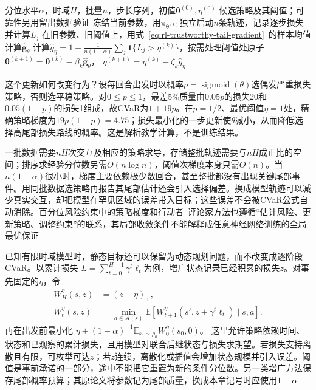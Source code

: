 \begin{algorithm}[累计CVaR的轨迹更新]
  \label{alg:rl-trustworthy-static-cvar}
  \begin{algorithmic}[1]
    \Require 分位水平$\alpha$，时域$H$，批量$n$，步长序列，初值$\bm{\theta}^{(0)},\eta^{(0)}$
    \Ensure 候选策略及其阈值；可靠性另用留出数据验证
      \State 冻结当前参数，用$\pi_{\bm{\theta}^{(k)}}$独立启动$n$条轨迹，记录逐步损失并计算$L_j$
      \State 在旧参数、旧阈值上，用式~\eqref{eq:rl-trustworthy-tail-gradient}~的样本均值计算$\widehat{\bm{g}}_\theta$
      \State 计算$\widehat g_\eta=1-\frac{1}{n(1-\alpha)}\sum_j\mathbf 1\{L_j>\eta^{(k)}\}$，按需处理阈值处原子
      \State $\bm{\theta}^{(k+1)}=\bm{\theta}^{(k)}-\beta_k\widehat{\bm{g}}_\theta$，
        $\eta^{(k+1)}=\eta^{(k)}-\zeta_k\widehat g_\eta$
    \EndFor
  \end{algorithmic}
\end{algorithm}

这个更新如何改变行为？设每回合出发时以概率$p=\operatorname{sigmoid}(\theta)$选偶发严重损失策略，否则选平稳策略。对$0\leq p\leq1$，最差5\%质量由$0.05p$的损失20和$0.05(1-p)$的损失1组成，故CVaR为$1+19p$。在$p=1/2$、最优阈值$\eta=1$处，精确策略梯度为$19p(1-p)=4.75$；损失最小化的一步更新使$\theta$减小，从而降低选择高尾部损失路线的概率。这是解析教学计算，不是训练结果。

一批数据需要$nH$次交互及相应的策略求导，存储整批轨迹需要与$nH$成正比的空间；排序求经验分位数另需$O(n\log n)$，阈值次梯度本身只需$O(n)$。当$n(1-\alpha)$很小时，梯度主要依赖极少数回合，甚至整批都没有出现关键尾部事件。用同批数据选策略再报告其尾部估计还会引入选择偏差。换成模型轨迹可以减少真实交互，却把模型在罕见区域的误差带入目标；这些误差不会被CVaR公式自动消除。百分位风险约束中的策略梯度和行动者--评论家方法也遵循“估计风险、更新策略、调整约束”的联系，其局部收敛条件不能解释成任意神经网络训练的全局最优保证

已知有限时域模型时，静态目标还可以保留为动态规划问题，而不改变成逐阶段CVaR。以累计损失
$L=\sum_{t=0}^{H-1}\gamma^t\ell_t$为例，增广状态记录已经积累的损失$z$。对事先固定的$\eta$，令
\begin{align}
  W_H^\eta(s,z)&=(z-\eta)_+, \nonumber\\
  W_t^\eta(s,z)&=\min_{a\in\mathcal A(s)}
       \mathbb E\!\left[
       W_{t+1}^\eta(s',z+\gamma^t\ell_t)\mid s,a\right].
  \label{eq:rl-trustworthy-augmented-risk}
\end{align}
再在出发前最小化
$\eta+(1-\alpha)^{-1}\mathbb E_{s_0\sim\rho_0}W_0^\eta(s_0,0)$。
这里允许策略依赖时间、状态和已观察的累计损失，且用模型对联合后继状态与损失求期望。若损失支持离散且有限，可枚举可达$z$；若$z$连续，离散化或插值会增加状态规模并引入误差。阈值是事前承诺的一部分，途中不能把它重置为新的条件分位数。另一类增广方法保存尾部概率预算；其原论文将参数记为尾部质量，换成本章记号时应使用$1-\alpha$

